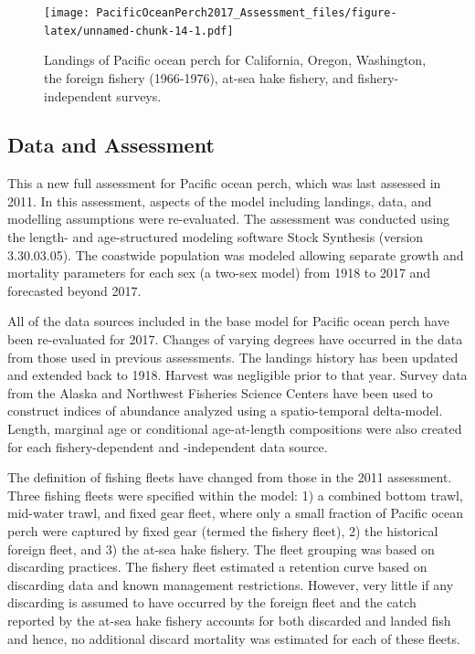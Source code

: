 \documentclass[12pt,]{article}
\begin{document}
\FloatBarrier

\begin{figure}
\centering
\texttt{[image: PacificOceanPerch2017\_Assessment\_files/figure-latex/unnamed-chunk-14-1.pdf]}
\caption{Landings of Pacific ocean perch for California, Oregon,
Washington, the foreign fishery (1966-1976), at-sea hake fishery, and
fishery-independent surveys. \label{fig:Exec_catch1}}
\end{figure}

\FloatBarrier

\subsection*{Data and Assessment}\label{data-and-assessment}

This a new full assessment for Pacific ocean perch, which was last
assessed in 2011. In this assessment, aspects of the model including
landings, data, and modelling assumptions were re-evaluated. The
assessment was conducted using the length- and age-structured modeling
software Stock Synthesis (version 3.30.03.05). The coastwide population
was modeled allowing separate growth and mortality parameters for each
sex (a two-sex model) from 1918 to 2017 and forecasted beyond 2017.

All of the data sources included in the base model for Pacific ocean
perch have been re-evaluated for 2017. Changes of varying degrees have
occurred in the data from those used in previous assessments. The
landings history has been updated and extended back to 1918. Harvest was
negligible prior to that year. Survey data from the Alaska and Northwest
Fisheries Science Centers have been used to construct indices of
abundance analyzed using a spatio-temporal delta-model. Length, marginal
age or conditional age-at-length compositions were also created for each
fishery-dependent and -independent data source.

The definition of fishing fleets have changed from those in the 2011
assessment. Three fishing fleets were specified within the model: 1) a
combined bottom trawl, mid-water trawl, and fixed gear fleet, where only
a small fraction of Pacific ocean perch were captured by fixed gear
(termed the fishery fleet), 2) the historical foreign fleet, and 3) the
at-sea hake fishery. The fleet grouping was based on discarding
practices. The fishery fleet estimated a retention curve based on
discarding data and known management restrictions. However, very little
if any discarding is assumed to have occurred by the foreign fleet and
the catch reported by the at-sea hake fishery accounts for both
discarded and landed fish and hence, no additional discard mortality was
estimated for each of these fleets.
\end{document}
